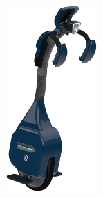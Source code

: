 \begin{cventries}
{\begin{minipage}{0.72\textwidth}
            \vspace{4mm}
            \vspace{5pt}
        \end{minipage}
        \hfill
        \begin{minipage}{0.25\textwidth}
            \vspace{5pt}
            \begin{center}
                \includegraphics[height=200pt]{common/img/Rimac/3.jpg}
            \end{center}
            \vspace{5pt}
        \end{minipage}
    }


\end{cventries}
